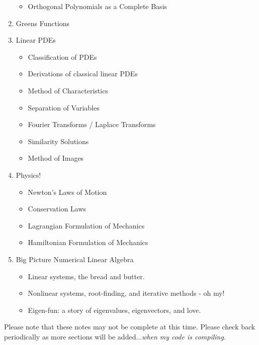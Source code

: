 \begin{enumerate}
\begin{itemize}
\item Orthogonal Polynomials as a Complete Basis
\end{itemize}
%
\item Greens Functions
%
\item Linear PDEs
\begin{itemize}
\item Classification of PDEs
\item Derivations of classical linear PDEs
\item Method of Characteristics
\item Separation of Variables
\item Fourier Transforms / Laplace Transforms
\item Similarity Solutions
\item Method of Images
\end{itemize}
%
\item Physics!
\begin{itemize}
\item Newton's Laws of Motion
\item Conservation Laws
\item Lagrangian Formulation of Mechanics
\item Hamiltonian Formulation of Mechanics
\end{itemize}
%
\item Big Picture Numerical Linear Algebra
\begin{itemize}
\item Linear systems, the bread and butter.
\item Nonlinear systems, root-finding, and iterative methods - oh my!
\item Eigen-fun: a story of eigenvalues, eigenvectors, and love.
\end{itemize}
%
\end{enumerate}

Please note that these notes may not be complete at this time. Please check back periodically as more sections will be added...\emph{when my code is compiling.} 